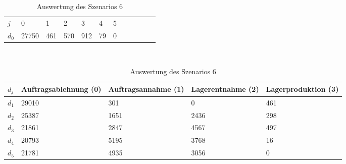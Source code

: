 \begin{table}[h!]
\renewcommand{\arraystretch}{1.5}
  \begin{center}
    \caption{Auswertung des Szenarios 6}  \label{AS6}
    \vspace*{3mm}
    \begin{tabular}{l l l l l l l l l l l l }  \hline 
         $j$ & 0 & 1  & 2 & 3 & 4  & 5   \\  
$d_{0}$ &  27750 &  461 &  570 &  912 &  79 &  0 \\
\hline
    \end{tabular} \\[3mm]
        \begin{tabular}{ l p{2.5cm} p{2.5cm} p{2.5cm} p{2.5cm} }   \hline    %
    $d_j$ & Auftrags\-ablehnung (0) & Auftrags\-annahme (1)  & Lager\-entnahme (2) & Lager\-produktion (3)\\\hline 
$d_1$ &  29010 &   301 &   0 &  461 \\
$d_2$ &  25387 &  1651 &  2436 &  298 \\
$d_3$ &  21861 &  2847 &  4567 &  497 \\
$d_4$ &  20793 &  5195 &  3768 &   16 \\
$d_5$ &  21781 &  4935 &  3056 &  0 \\
          \hline
   \end{tabular} \\[3mm]
     \end{center}
\end{table}



